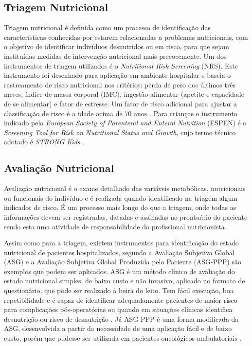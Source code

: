 \subsection{Triagem Nutricional} \label{subD-triagem}
Triagem nutricional é definida como um processo de identificação das características conhecidas por estarem relacionadas a problemas nutricionais, com o objetivo de identificar indivíduos desnutridos ou em risco, para que sejam instituídas medidas de intervenção nutricional mais precocemente. Um dos instrumentos de triagem utilizados é o \textit{Nutritional Risk Screening} (NRS). Este instrumento foi desenhado para aplicação em ambiente hospitalar e baseia o rastreamento de risco nutricional nos critérios: perda de peso dos últimos três meses, índice de massa corporal (IMC), ingestão alimentar (apetite e capacidade de se alimentar) e fator de estresse. Um fator de risco adicional para ajustar a classificação de risco é a idade acima de 70 anos \cite{protocolonutricionaladulto, manualnutricao2016}. Para crianças o instrumento indicado pela \textit{European Society of Parenteral and Enteral Nutrition} (ESPEN) é o \textit{Screening Tool for Risk on Nutritional Status and Growth}, cujo termo técnico adotado é \textit{STRONG Kids} \cite{protocolonutricionalinfantil}. 

\subsection{Avaliação Nutricional} \label{subD-avaliacao}
Avaliação nutricional é o exame detalhado das variáveis metabólicas, nutricionais ou funcionais do indivíduo e é realizada quando identificado na triagem algum indicador de risco. É um processo mais longo do que a triagem, onde todas as informações devem ser registradas, datadas e assinadas no prontuário do paciente sendo esta uma atividade de responsabilidade do profissional nutricionista \cite{protocolonutricionaladulto}. 

Assim como para a triagem, existem instrumentos para identificação do estado nutricional de pacientes hospitalizados, segundo  a Avaliação Subjetiva Global (ASG) e a Avaliação Subjetiva Global Produzida pelo Paciente (ASG-PPP) são exemplos que podem ser aplicados. ASG é um método clínico de avaliação do estado nutricional simples, de baixo custo e não invasivo, aplicado no formato de questionário, que pode ser realizado à beira do leito. Tem fácil execução, boa repetibilidade e é capaz de identificar adequadamente pacientes de maior risco para complicações pós-operatórias ou quando em situações clínicas identifica desnutrição ou risco de desnutrição \cite{baker1982}. Já ASG-PPP é uma forma modificada da ASG, desenvolvida a partir da necessidade de uma aplicação fácil e de baixo custo, porém que pudesse ser utilizada em pacientes oncológicos ambulatoriais \cite{ottery1996}.

